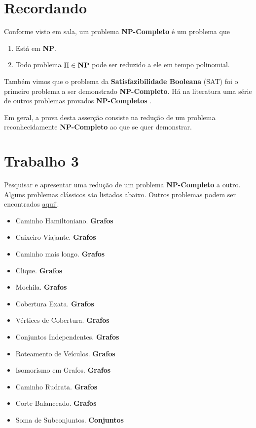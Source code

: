 \documentclass[12pt, a4paper]{article}
\begin{document}


\tableofcontents
\pagebreak

\listoffigures
\pagebreak

\listoftables
\pagebreak

\section{Recordando}

Conforme visto em sala, um problema \textbf{NP-Completo} é um problema que

\begin{enumerate}
  \item Está em \textbf{NP}.
  \item Todo problema $\Pi \in \text{\textbf{NP}}$ pode ser reduzido a ele em tempo polinomial.
\end{enumerate}

Também vimos que o problema da \textbf{Satisfazibilidade Booleana} (SAT) foi o primeiro problema a ser demonstrado \textbf{NP-Completo}. Há na literatura uma série de outros problemas provados \textbf{NP-Completos} \cite{sipser06}.

Em geral, a prova desta asserção consiste na redução de um problema reconhecidamente \textbf{NP-Completo} ao que se quer demonstrar.

\section{Trabalho 3}

Pesquisar e apresentar uma redução de um problema \textbf{NP-Completo} a outro. Alguns problemas clássicos são listados abaixo. Outros problemas podem ser encontrados \href{http://en.wikipedia.org/wiki/List_of_NP-complete_problems}{aqui!}.

\begin{itemize}
  \item Caminho Hamiltoniano. \cite{sipser06} {\color{red}\textbf{Grafos}}
  \item Caixeiro Viajante. {\color{red}\textbf{Grafos}}
  \item Caminho mais longo. {\color{red}\textbf{Grafos}}
  \item Clique. \cite{sipser06} {\color{red}\textbf{Grafos}}
  \item Mochila. {\color{red}\textbf{Grafos}}
  \item Cobertura Exata. {\color{red}\textbf{Grafos}}
  \item Vértices de Cobertura. \cite{sipser06} {\color{red}\textbf{Grafos}}
  \item Conjuntos Independentes. {\color{red}\textbf{Grafos}}
  \item Roteamento de Veículos. {\color{red}\textbf{Grafos}}
  \item Isomorismo em Grafos. {\color{red}\textbf{Grafos}}
  \item Caminho Rudrata. {\color{red}\textbf{Grafos}}
  \item Corte Balanceado. {\color{red}\textbf{Grafos}}
  \item Soma de Subconjuntos. \cite{sipser06} {\color{blue}\textbf{Conjuntos}}
\end{itemize}
\end{document}

